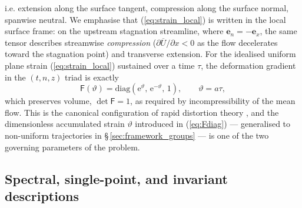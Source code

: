 \documentclass[lineno]{JFM-FLM_Au}
\begin{document}
i.e. extension along the surface tangent, compression along the surface
normal, spanwise neutral. We emphasise that (\ref{eq:strain_local}) is
written in the local surface frame: on the upstream stagnation streamline,
where $\boldsymbol{e}_n = -\boldsymbol{e}_x$, the same tensor describes
streamwise \emph{compression}
($\partial\overline{U}/\partial x < 0$ as the flow decelerates toward the
stagnation point) and transverse extension. For the idealised uniform plane
strain (\ref{eq:strain_local}) sustained over a time $\tau$, the
deformation gradient in the $(t,n,z)$ triad is exactly
\begin{equation}
  \mathsf{F}(\vartheta)
  = \mathrm{diag}\!\left(\mathrm{e}^{\vartheta},\,
                          \mathrm{e}^{-\vartheta},\, 1\right),
  \qquad
  \vartheta = a\tau,
  \label{eq:Fdiag}
\end{equation}
which preserves volume, $\det\mathsf{F} = 1$, as required by
incompressibility of the mean flow. This is the canonical configuration of
rapid distortion theory \citep{BatchelorProudman1954,Hunt1973}, and the
dimensionless accumulated strain $\vartheta$ introduced in
(\ref{eq:Fdiag}) --- generalised to non-uniform trajectories in
\S\,\ref{sec:framework_groups} --- is one of the two governing parameters
of the problem.

\subsection{Spectral, single-point, and invariant descriptions}
\label{sec:framework_descriptions}
\end{document}
